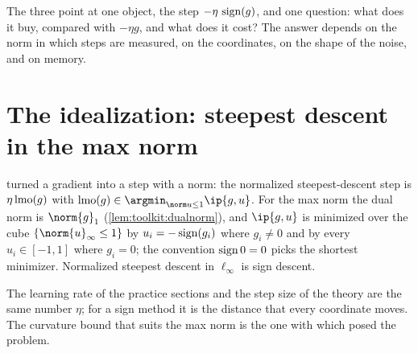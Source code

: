 \begin{refsection}

The three point at one object, the step $-\eta\,\operatorname{sign}(g)$, and one question: what does it buy, compared with $-\eta g$, and what does it cost? The answer depends on the norm in which steps are measured, on the coordinates, on the shape of the noise, and on memory.

\section{The idealization: steepest descent in the max norm}\label{sec:sign:ideal}

 turned a gradient into a step with a norm: the normalized steepest-descent step is $\eta\operatorname{lmo}(g)$ with $\lmo(g)\in\argmin_{\norm u\le1}\ip{g,u}$. For the max norm the dual norm is $\norm{g}_1$ (\cref{lem:toolkit:dualnorm}), and $\ip{g,u}$ is minimized over the cube $\{\norm{u}_\infty\le1\}$ by $u_i=-\operatorname{sign}(g_i)$ where $g_i\ne0$ and by every $u_i\in[-1,1]$ where $g_i=0$; the convention $\operatorname{sign}0=0$ picks the shortest minimizer. Normalized steepest descent in $\ell_\infty$ is sign descent.


The learning rate of the practice sections and the step size of the theory are the same number $\eta$; for a sign method it is the distance that every coordinate moves. The curvature bound that suits the max norm is the one with which \textcite{BernsteinEtAl2018} posed the problem.



\end{refsection}
